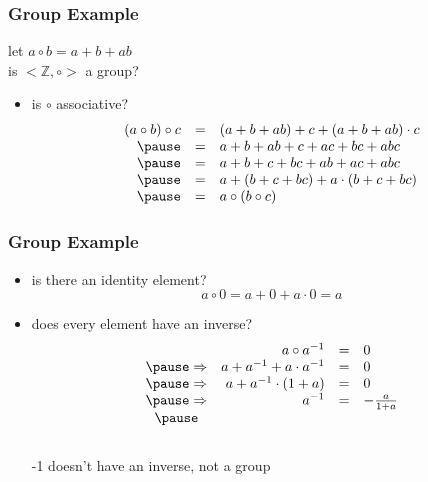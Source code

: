 \documentclass[dvipsnames]{beamer}
\begin{document}
\begin{frame}
  \frametitle{Group Example}

  \begin{example}
    let $a \circ b = a + b + ab$\\
    is $<\mathbb{Z}, \circ>$ a group?

    \pause
    \begin{itemize}
      \item is $\circ$ associative?
        \[ \begin{array}{rcl}
          (a \circ b) \circ c & = & (a + b + ab) + c + (a + b + ab) \cdot c\\\pause
                              & = & a + b + ab + c + ac + bc + abc\\\pause
                              & = & a + b + c + bc + ab + ac + abc\\\pause
                              & = & a + (b + c + bc) + a \cdot (b + c + bc)\\\pause
                              & = & a \circ (b \circ c)
        \end{array} \]
     \end{itemize}
 \end{example}
\end{frame}

\begin{frame}
  \frametitle{Group Example}

  \begin{example}
    \begin{itemize}
      \item is there an identity element?
        \[ a \circ 0 = a + 0 + a \cdot 0 = a \]

      \pause
      \item does every element have an inverse?
        \[ \begin{array}{crcl}
                      & a \circ a^{-1} & = & 0\\\pause
          \Rightarrow & a + a^{-1} + a \cdot a^{-1} & = & 0\\\pause
          \Rightarrow & a + a^{-1} \cdot (1 + a) & = & 0\\\pause
          \Rightarrow & a^{-1} & = & -\frac{a}{1 + a}\\\pause
        \end{array} \]\\
        -1 doesn't have an inverse, not a group
     \end{itemize}
 \end{example}
\end{frame}
\end{document}
